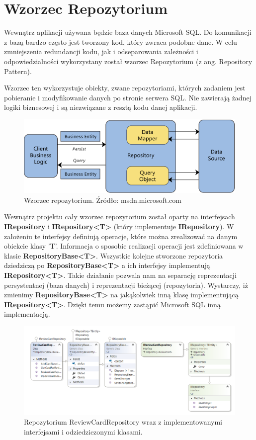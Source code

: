 \section{Wzorzec Repozytorium}
\label{section_Repo}
Wewnątrz aplikacji używana będzie baza danych Microsoft SQL. Do komunikacji z bazą bardzo często jest tworzony kod, który zwraca podobne dane. W celu zmniejszenia redundancji kodu, jak i odseparowania zależności i odpowiedzialności wykorzystany został wzorzec Repozytorium (z ang. Repository Pattern)\cite{RepositoryUnitOfWorkPattern}.

Wzorzec ten wykorzystuje obiekty, zwane repozytoriami, których zadaniem jest pobieranie i modyfikowanie danych po stronie serwera SQL. Nie zawierają żadnej logiki biznesowej i są niezwiązane z resztą kodu danej aplikacji. 

\begin{figure}[h]
	\centering
	\includegraphics[width=\textwidth]{images/RepositoryPattern.png}
	 \caption{Wzorzec repozytorium. Źródło: msdn.microsoft.com}
\end{figure}

Wewnątrz projektu cały wzorzec repozytorium został oparty na interfejsach \textbf{IRepository} i \textbf{IRepository<T>} (który implementuje \textbf{IRepository}). W założeniu te interfejsy definiują operacje, które można zrealizować na danym obiekcie klasy 'T'. Informacja o sposobie realizacji operacji jest zdefiniowana w klasie \textbf{RepositoryBase<T>}.
Wszystkie kolejne stworzone repozytoria dziedziczą po \textbf{RepositoryBase<T>} a ich interfejsy implementują \textbf{IRepository<T>}. 
Takie działanie pozwala nam na separację reprezentacji persystentnej (baza danych) i reprezentacji bieżącej (repozytoria). Wystarczy, iż zmienimy \textbf{RepositoryBase<T>} na jakąkolwiek inną klasę implementującą \textbf{IRepository<T>}. Dzięki temu możemy zastąpić Microsoft SQL inną implementacją.


\begin{figure}[h]
	\centering
	\includegraphics[width=\textwidth]{images/ReviewRepository.png}
	 \caption{Repozytorium ReviewCardRepository wraz z implementowanymi interfejsami i odziedziczonymi klasami.}
\end{figure}

